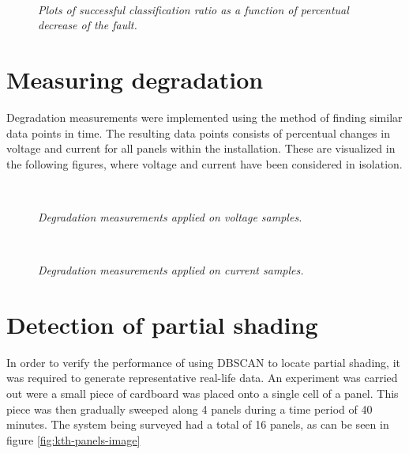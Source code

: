 \begin{figure}[here]
\centering
{}
~
\caption[Immediate failure detection performance]{\emph{
   Plots of successful classification ratio as a function of percentual decrease of the fault.
}}
\end{figure}


\section{Measuring degradation}
Degradation measurements were implemented using the method of finding similar data points in time.
The resulting data points consists of percentual changes in voltage and current for all panels within the installation.
These are visualized in the following figures, where voltage and current have been considered in isolation.


\begin{figure}[here]
\centering
{}
~
\caption[Performance of distance-based method (voltage)]{\emph{Degradation measurements applied on voltage samples.}}
\end{figure}


\begin{figure}[here]
\centering
{}
~
\caption[Performance of distance-based method (current)]{\emph{Degradation measurements applied on current samples.}}
\end{figure}

\section{Detection of partial shading}
In order to verify the performance of using DBSCAN to locate partial shading, it was required to generate representative real-life data.
An experiment was carried out were a small piece of cardboard was placed onto a single cell of a panel.
This piece was then gradually sweeped along 4 panels during a time period of 40 minutes.
The system being surveyed had a total of 16 panels, as can be seen in figure \ref{fig:kth-panels-image}


